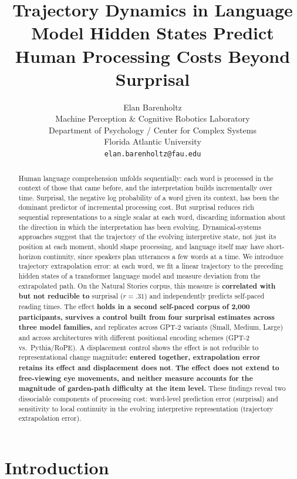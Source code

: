 \documentclass[12pt]{article}
\title{Trajectory Dynamics in Language Model Hidden States Predict Human Processing Costs Beyond Surprisal}
\author{Elan Barenholtz\\
Machine Perception \& Cognitive Robotics Laboratory\\
Department of Psychology / Center for Complex Systems\\
Florida Atlantic University\\
\texttt{elan.barenholtz@fau.edu}}
\date{}
\newcommand{\new}[1]{{\bfseries #1}}
\begin{document}
\maketitle

\begin{abstract}
Human language comprehension unfolds sequentially: each word is processed in the context of those that came before, and the interpretation builds incrementally over time. Surprisal, the negative log probability of a word given its context, has been the dominant predictor of incremental processing cost. But surprisal reduces rich sequential representations to a single scalar at each word, discarding information about the direction in which the interpretation has been evolving. Dynamical-systems approaches suggest that the trajectory of the evolving interpretive state, not just its position at each moment, should shape processing, and language itself may have short-horizon continuity, since speakers plan utterances a few words at a time. We introduce trajectory extrapolation error: at each word, we fit a linear trajectory to the preceding hidden states of a transformer language model and measure deviation from the extrapolated path. On the Natural Stories corpus, this measure is \new{correlated with but not reducible to} surprisal (\new{$r = .31$}) and independently predicts self-paced reading times. The effect \new{holds in a second self-paced corpus of 2,000 participants, survives a control built from four surprisal estimates across three model families,} and replicates across GPT-2 variants (Small, Medium, Large) and across architectures with different positional encoding schemes (GPT-2 vs.\ Pythia/RoPE). A displacement control shows the effect is not reducible to representational change magnitude\new{: entered together, extrapolation error retains its effect and displacement does not}. \new{The effect does not extend to free-viewing eye movements, and neither measure accounts for the magnitude of garden-path difficulty at the item level.} These findings reveal two dissociable components of processing cost: word-level prediction error (surprisal) and sensitivity to local continuity in the evolving interpretive representation (trajectory extrapolation error).

\end{abstract}

\newpage

\section{Introduction}
\end{document}
